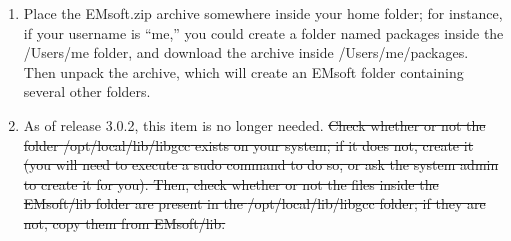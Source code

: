 \documentclass[DIV=calc, paper=letter, fontsize=11pt]{scrartcl}	 %
\begin{document}
\begin{enumerate}
\item Place the \textsf{EMsoft.zip} archive somewhere inside your home folder; for instance, if your username is ``me,'' you could create 
a folder named \textsf{packages} inside the \textsf{/Users/me} folder, and download the archive inside \textsf{/Users/me/packages}.
Then unpack the archive, which will create an \textsf{EMsoft} folder containing several other folders.

\item {\color{red}As of release 3.0.2, this item is no longer needed.} \st{Check whether or not the folder \textsf{/opt/local/lib/libgcc} exists on your system; if it does not,
create it (you will need to execute a \textsf{sudo} command to do so, or ask the system admin to 
create it for you).  Then, check whether or not the files inside the \textsf{EMsoft/lib} folder are present 
in the \textsf{/opt/local/lib/libgcc} folder; if they are not, copy them from \textsf{EMsoft/lib}.}


\end{enumerate}
\end{document}
